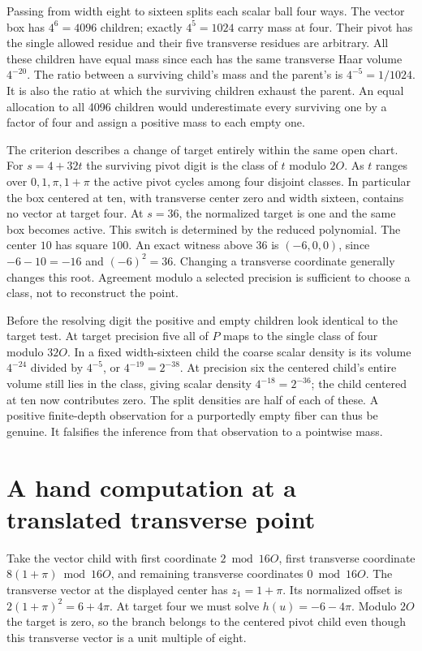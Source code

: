 \documentclass[12pt,letterpaper]{article}
\begin{document}
Passing from width eight to sixteen splits each scalar ball four ways. The vector box has $4^6=4096$ children; exactly $4^5=1024$ carry mass at four. Their pivot has the single allowed residue and their five transverse residues are arbitrary. All these children have equal mass since each has the same transverse Haar volume $4^{-20}$. The ratio between a surviving child's mass and the parent's is $4^{-5}=1/1024$. It is also the ratio at which the surviving children exhaust the parent. An equal allocation to all 4096 children would underestimate every surviving one by a factor of four and assign a positive mass to each empty one.

The criterion describes a change of target entirely within the same open chart. For $s=4+32t$ the surviving pivot digit is the class of $t$ modulo $2O$. As $t$ ranges over $0,1,\pi,1+\pi$ the active pivot cycles among four disjoint classes. In particular the box centered at ten, with transverse center zero and width sixteen, contains no vector at target four. At $s=36$, the normalized target is one and the same box becomes active. This switch is determined by the reduced polynomial. The center $10$ has square $100$. An exact witness above $36$ is $(-6,0,0)$, since $-6-10=-16$ and $(-6)^2=36$. Changing a transverse coordinate generally changes this root. Agreement modulo a selected precision is sufficient to choose a class, not to reconstruct the point.

Before the resolving digit the positive and empty children look identical to the target test. At target precision five all of $P$ maps to the single class of four modulo $32O$. In a fixed width-sixteen child the coarse scalar density is its volume $4^{-24}$ divided by $4^{-5}$, or $4^{-19}=2^{-38}$. At precision six the centered child's entire volume still lies in the class, giving scalar density $4^{-18}=2^{-36}$; the child centered at ten now contributes zero. The split densities are half of each of these. A positive finite-depth observation for a purportedly empty fiber can thus be genuine. It falsifies the inference from that observation to a pointwise mass.

\section{A hand computation at a translated transverse point}
Take the vector child with first coordinate $2\bmod16O$, first transverse coordinate $8(1+\pi)\bmod16O$, and remaining transverse coordinates $0\bmod16O$. The transverse vector at the displayed center has $z_1=1+\pi$. Its normalized offset is $2(1+\pi)^2=6+4\pi$. At target four we must solve $h(u)=-6-4\pi$. Modulo $2O$ the target is zero, so the branch belongs to the centered pivot child even though this transverse vector is a unit multiple of eight.
\end{document}
